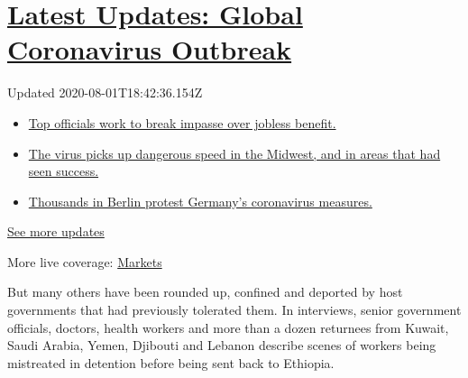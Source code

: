 \hypertarget{latest-updates-global-coronavirus-outbreak}{%
\section{\texorpdfstring{\href{https://www.nytimes.com/2020/08/01/world/coronavirus-covid-19.html?action=click\&pgtype=Article\&state=default\&region=MAIN_CONTENT_1\&context=storylines_live_updates}{Latest
Updates: Global Coronavirus
Outbreak}}{Latest Updates: Global Coronavirus Outbreak}}\label{latest-updates-global-coronavirus-outbreak}}

Updated 2020-08-01T18:42:36.154Z

\begin{itemize}
\tightlist
\item
  \href{https://www.nytimes.com/2020/08/01/world/coronavirus-covid-19.html?action=click\&pgtype=Article\&state=default\&region=MAIN_CONTENT_1\&context=storylines_live_updates\#link-3ac56579}{Top
  officials work to break impasse over jobless benefit.}
\item
  \href{https://www.nytimes.com/2020/08/01/world/coronavirus-covid-19.html?action=click\&pgtype=Article\&state=default\&region=MAIN_CONTENT_1\&context=storylines_live_updates\#link-8796723}{The
  virus picks up dangerous speed in the Midwest, and in areas that had
  seen success.}
\item
  \href{https://www.nytimes.com/2020/08/01/world/coronavirus-covid-19.html?action=click\&pgtype=Article\&state=default\&region=MAIN_CONTENT_1\&context=storylines_live_updates\#link-25930521}{Thousands
  in Berlin protest Germany's coronavirus measures.}
\end{itemize}

\href{https://www.nytimes.com/2020/08/01/world/coronavirus-covid-19.html?action=click\&pgtype=Article\&state=default\&region=MAIN_CONTENT_1\&context=storylines_live_updates}{See
more updates}

More live coverage:
\href{https://www.nytimes.com/live/2020/07/31/business/stock-market-today-coronavirus?action=click\&pgtype=Article\&state=default\&region=MAIN_CONTENT_1\&context=storylines_live_updates}{Markets}

But many others have been rounded up, confined and deported by host
governments that had previously tolerated them. In interviews, senior
government officials, doctors, health workers and more than a dozen
returnees from Kuwait, Saudi Arabia, Yemen, Djibouti and Lebanon
describe scenes of workers being mistreated in detention before being
sent back to Ethiopia.

